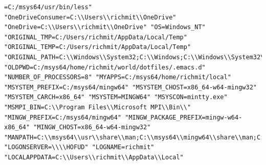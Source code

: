 \documentclass[11pt]{article}
\begin{document}
\begin{verbatim}
=C:/msys64/usr/bin/less" "OneDriveConsumer=C:\\Users\\richmit\\OneDrive" "OneDrive=C:\\Users\\richmit\\OneDrive" "OS=Windows_NT" "ORIGINAL_TMP=C:/Users/richmit/AppData/Local/Temp" "ORIGINAL_TEMP=C:/Users/richmit/AppData/Local/Temp" "ORIGINAL_PATH=C:\\Windows\\System32;C:\\Windows;C:\\Windows\\System32\\Wbem;C:\\Windows\\System32\\WindowsPowerShell\\v1.0\\" "OLDPWD=C:/msys64/home/richmit/world/dotfiles/.emacs.d" "NUMBER_OF_PROCESSORS=8" "MYAPPS=C:/msys64/home/richmit/local" "MSYSTEM_PREFIX=C:/msys64/mingw64" "MSYSTEM_CHOST=x86_64-w64-mingw32" "MSYSTEM_CARCH=x86_64" "MSYSTEM=MINGW64" "MSYSCON=mintty.exe" "MSMPI_BIN=C:\\Program Files\\Microsoft MPI\\Bin\\" "MINGW_PREFIX=C:/msys64/mingw64" "MINGW_PACKAGE_PREFIX=mingw-w64-x86_64" "MINGW_CHOST=x86_64-w64-mingw32" "MANPATH=C:\\msys64\\usr\\share\\man;C:\\msys64\\mingw64\\share\\man;C:\\msys64\\mingw32\\share\\man" "LOGONSERVER=\\\\HOFUD" "LOGNAME=richmit" "LOCALAPPDATA=C:\\Users\\richmit\\AppData\\Local" 
\end{verbatim}
\end{document}
